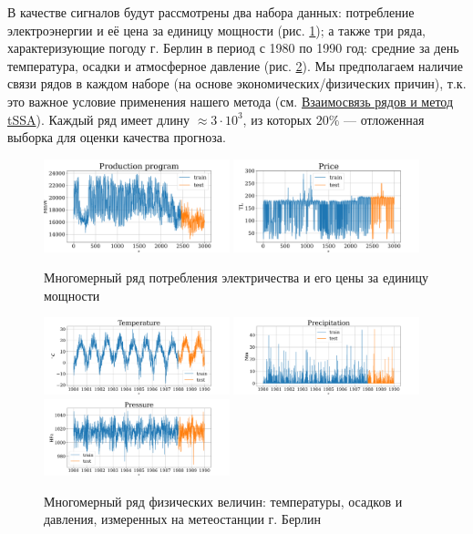 	В качестве сигналов будут рассмотрены два набора данных: потребление электроэнергии и её цена за единицу мощности (рис. \ref{fig:electr_data}); а также три ряда, характеризующие погоду г. Берлин в период с 1980 по 1990 год: средние за день температура, осадки и атмосферное давление (рис. \ref{fig:weather_data}). Мы предполагаем наличие связи рядов в каждом наборе (на основе экономических/физических причин), т.к. это важное условие применения нашего метода (см. \hyperref[sec:tssa_method]{Взаимосвязь рядов и метод tSSA}). Каждый ряд имеет длину $ \approx 3 \cdot 10^3 $, из которых $ 20\% $ --- отложенная выборка для оценки качества прогноза.
	
	\begin{figure}[h]
		\centering
		\includegraphics[width=0.48\textwidth, keepaspectratio]{../../figs/Electricity_Production}
		\includegraphics[width=0.48\textwidth, keepaspectratio]{../../figs/Electricity_Price}
		\caption{Многомерный ряд потребления электричества и его цены за единицу мощности}\label{fig:electr_data}
	\end{figure}
	
	\begin{figure}[h]
		\centering
		\includegraphics[width=0.48\textwidth, keepaspectratio]{../../figs/Temperature.png}
		\includegraphics[width=0.48\textwidth, keepaspectratio]{../../figs/Precipitation.png}
		\includegraphics[width=0.48\textwidth, keepaspectratio]{../../figs/Pressure.png}
		\caption{Многомерный ряд физических величин: температуры, осадков и давления, измеренных на метеостанции г. Берлин}\label{fig:weather_data}
	\end{figure}
	

